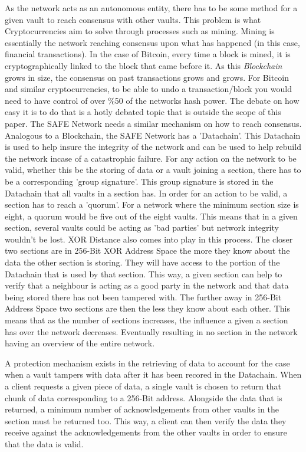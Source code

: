 As the network acts as an autonomous entity, there has to be some method for a given vault to reach consensus with other vaults. This problem is what Cryptocurrencies aim to solve through processes such as mining. Mining is essentially the network reaching consensus upon what has happened (in this case, financial transactions). In the case of Bitcoin, every time a block is mined, it is cryptographically linked to the block that came before it. As this \textit{Blockchain} grows in size, the consensus on past transactions grows and grows. For Bitcoin and similar cryptocurrencies, to be able to undo a transaction/block you would need to have control of over \%50 of the networks hash power. The debate on how easy it is to do that is a hotly debated topic that is outside the scope of this paper. The SAFE Network needs a similar mechanism on how to reach consensus. Analogous to a Blockchain, the SAFE Network has a 'Datachain'. This Datachain is used to help insure the integrity of the network and can be used to help rebuild the network incase of a catastrophic failure. For any action on the network to be valid, whether this be the storing of data or a vault joining a section, there has to be a corresponding 'group signature'. This group signature is stored in the Datachain that all vaults in a section has. In order for an action to be valid, a section has to reach a 'quorum'. For a network where the minimum section size is eight, a quorum would be five out of the eight vaults. This means that in a given section, several vaults could be acting as 'bad parties' but network integrity wouldn't be lost. XOR Distance also comes into play in this process. The closer two sections are in 256-Bit XOR Address Space the more they know about the data the other section is storing. They will have access to the portion of the Datachain that is used by that section. This way, a given section can help to verify that a neighbour is acting as a good party in the network and that data being stored there has not been tampered with. The further away in 256-Bit Address Space two sections are then the less they know about each other. This means that as the number of sections increases, the influence a given a section has over the network decreases. Eventually resulting in no section in the network having an overview of the entire network.

A protection mechanism exists in the retrieving of data to account for the case when a vault tampers with data after it has been recored in the Datachain. When a client requests a given piece of data, a single vault is chosen to return that chunk of data corresponding to a 256-Bit address. Alongside the data that is returned, a minimum number of acknowledgements from other vaults in the section must be returned too. This way, a client can then verify the data they receive against the acknowledgements from the other vaults in order to ensure that the data is valid.

